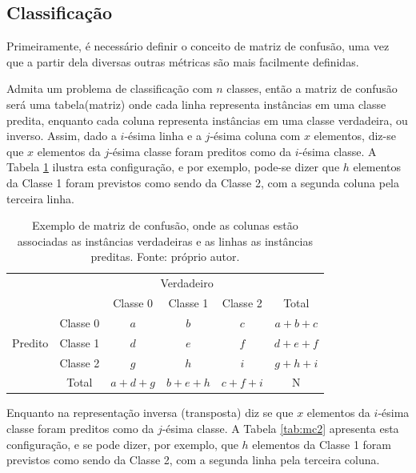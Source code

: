 \subsection{Classificação}

Primeiramente, é necessário definir o conceito de matriz de confusão, uma vez que a partir dela diversas outras métricas são mais facilmente definidas. 

Admita um problema de classificação com $n$ classes, então a matriz de confusão será uma tabela(matriz) onde cada linha representa instâncias em uma classe predita, enquanto cada coluna representa instâncias em uma classe verdadeira, ou inverso. Assim, dado a $i$-ésima linha e a $j$-ésima coluna com $x$ elementos, diz-se que $x$ elementos da $j$-ésima classe foram preditos como da $i$-ésima classe. A Tabela \ref{tab:mc1} ilustra esta configuração, e por exemplo, pode-se dizer que $h$ elementos da Classe 1 foram previstos como sendo da Classe 2, com a segunda coluna pela terceira linha.

\begin{table}[hhh]
\begin{tabular}{l|l|c|c|c|c}
\multicolumn{2}{c}{}&\multicolumn{3}{c}{Verdadeiro}&\\ \cline{3-5}
\multicolumn{2}{c|}{}&Classe 0& Classe 1 & Classe 2&\multicolumn{1}{c}{Total}\\ \cline{2-5}
\multirow{3}{*}{Predito}& Classe 0 & $a$ & $b$ & $c$ & $a+b+c$\\ \cline{2-5}
                        & Classe 1 & $d$ & $e$ & $f$ & $d+e+f$\\ \cline{2-5}
                        & Classe 2 & $g$ & $h$ & $i$ & $g+h+i$\\ \cline{2-5}
\multicolumn{1}{c}{} & \multicolumn{1}{c}{Total} & \multicolumn{1}{c}{$a+d+g$} & \multicolumn{    1}{c}{$b+e+h$} & \multicolumn{1}{c}{$c+f+i$} & \multicolumn{1}{c}{N}\\
\end{tabular}
\caption{Exemplo de matriz de confusão, onde as colunas estão associadas as instâncias verdadeiras e as linhas as instâncias preditas. Fonte: próprio autor.}
\label{tab:mc1}
\end{table}

Enquanto na representação inversa (transposta) diz se que $x$ elementos da $i$-ésima classe foram preditos como da $j$-ésima classe. A Tabela \ref{tab:mc2} apresenta esta configuração, e se pode dizer, por exemplo, que $h$ elementos da Classe 1 foram previstos como sendo da Classe 2, com a segunda linha pela terceira coluna.

